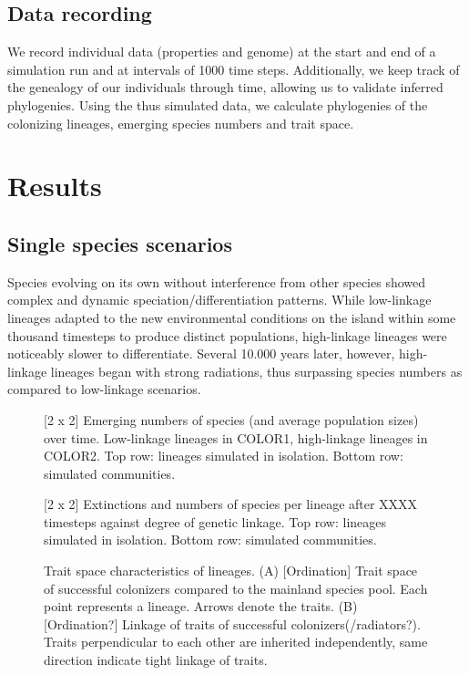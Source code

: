 \documentclass[a4paper]{scrartcl}
\begin{document}
\subsection{Data recording}
We record individual data (properties and genome) at the start and end of a simulation run
and at intervals of 1000 time steps.%
Additionally, we keep track of the genealogy of our individuals through time,
allowing us to validate inferred phylogenies.
Using the thus simulated data, we calculate phylogenies of the colonizing lineages, emerging species numbers and
trait space. %

\section{Results}

\subsection{Single species scenarios}
Species evolving on its own without interference from other species showed complex and dynamic speciation/differentiation patterns.
While low-linkage lineages adapted to the new environmental conditions on the island within some thousand timesteps to produce distinct populations,
high-linkage lineages were noticeably slower to differentiate.
Several 10.000 years later, however, high-linkage lineages began with strong radiations, thus surpassing species numbers as compared to low-linkage scenarios.

\begin{figure}
  \caption{[2 x 2]
    Emerging numbers of species (and average population sizes) over time.
    Low-linkage lineages in COLOR1, high-linkage lineages in COLOR2.
    Top row: lineages simulated in isolation.
    Bottom row: simulated communities.}
  \label{specieslinkage}
\end{figure}

\begin{figure}
  \caption{[2 x 2]
    Extinctions and numbers of species per lineage after XXXX timesteps against degree of genetic linkage.
    Top row: lineages simulated in isolation.
    Bottom row: simulated communities.}
  \label{specieslinkage}
\end{figure}

\begin{figure}
  \caption{Trait space characteristics of lineages.
    (A) [Ordination] Trait space of successful colonizers compared to the mainland species pool. Each point represents a lineage.
    Arrows denote the traits.
    (B) [Ordination?] Linkage of traits of successful colonizers(/radiators?). Traits perpendicular to each other are inherited independently,
  same direction indicate tight linkage of traits.}
  \label{traitspace}
\end{figure}
\end{document}

